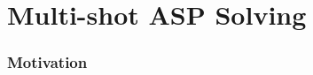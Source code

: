 \part{Multi-shot ASP Solving}
\newcommand{\QRG}{\ensuremath{Q}}
\newcommand{\RRG}{\ensuremath{R}}
\section{Motivation}

